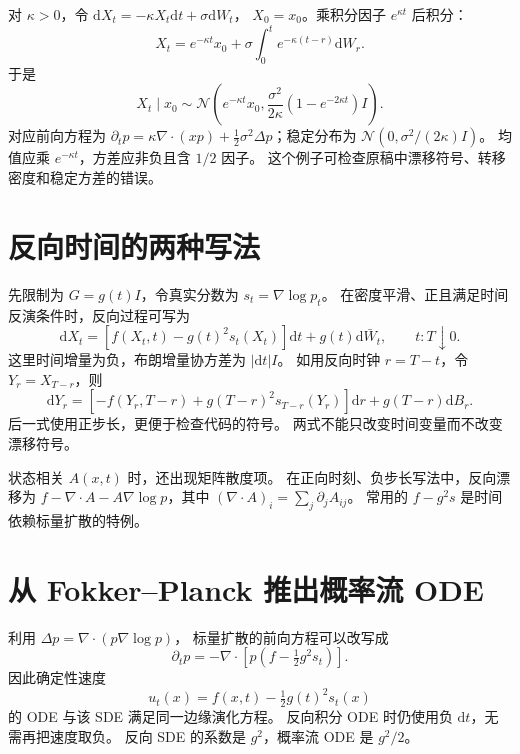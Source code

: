 对 $\kappa>0$，令 $\mathrm dX_t=-\kappa X_t\mathrm dt+\sigma\mathrm dW_t$，
$X_0=x_0$。乘积分因子 $e^{\kappa t}$ 后积分：
\[
X_t=e^{-\kappa t}x_0+\sigma\int_0^t e^{-\kappa(t-r)}\mathrm dW_r.
\]
于是
\begin{equation}\label{th:ou}
X_t\mid x_0\sim\mathcal N\left(e^{-\kappa t}x_0,
 \frac{\sigma^2}{2\kappa}(1-e^{-2\kappa t})I\right).
\end{equation}
对应前向方程为 $\partial_t p=\kappa\nabla\cdot(xp)+
\tfrac12\sigma^2\Delta p$；稳定分布为 $\mathcal N(0,\sigma^2/(2\kappa)I)$。
均值应乘 $e^{-\kappa t}$，方差应非负且含 $1/2$ 因子。
这个例子可检查原稿中漂移符号、转移密度和稳定方差的错误。

\section{反向时间的两种写法}

先限制为 $G=g(t)I$，令真实分数为 $s_t=\nabla\log p_t$。
在密度平滑、正且满足时间反演条件时，反向过程可写为
\begin{equation}\label{th:reverse-negative-time}
\mathrm dX_t=[f(X_t,t)-g(t)^2s_t(X_t)]\mathrm dt
 +g(t)\mathrm d\bar W_t,\qquad t:T\downarrow0.
\end{equation}
这里时间增量为负，布朗增量协方差为 $|\mathrm dt|I$。
如用反向时钟 $r=T-t$，令 $Y_r=X_{T-r}$，则
\begin{equation}\label{th:reverse-positive-time}
\mathrm dY_r=[-f(Y_r,T-r)+g(T-r)^2s_{T-r}(Y_r)]\mathrm dr
 +g(T-r)\mathrm dB_r.
\end{equation}
后一式使用正步长，更便于检查代码的符号。
两式不能只改变时间变量而不改变漂移符号。

状态相关 $A(x,t)$ 时，还出现矩阵散度项。
在正向时刻、负步长写法中，反向漂移为
$f-\nabla\cdot A-A\nabla\log p$，其中
$(\nabla\cdot A)_i=\sum_j\partial_jA_{ij}$。
常用的 $f-g^2s$ 是时间依赖标量扩散的特例。

\section{从 Fokker--Planck 推出概率流 ODE}

利用 $\Delta p=\nabla\cdot(p\nabla\log p)$，
标量扩散的前向方程可以改写成
\[
\partial_t p=-\nabla\cdot\left[p\left(f-\tfrac12g^2s_t\right)\right].
\]
因此确定性速度
\begin{equation}\label{th:pf-ode}
u_t(x)=f(x,t)-\tfrac12g(t)^2s_t(x)
\end{equation}
的 ODE 与该 SDE 满足同一边缘演化方程。
反向积分 ODE 时仍使用负 $\mathrm dt$，无需再把速度取负。
反向 SDE 的系数是 $g^2$，概率流 ODE 是 $g^2/2$。

